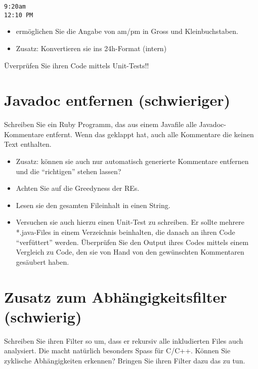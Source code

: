 \documentclass[a4paper,11pt,oneside]{scrbook}
\begin{document}
\begin{lstlisting}
9:20am
12:10 PM
\end{lstlisting}

\begin{itemize}
	\item ermöglichen Sie die Angabe von am/pm in Gross und Kleinbuchstaben.
	\item Zusatz: Konvertieren sie ins 24h-Format (intern)
\end{itemize}

Üverprüfen Sie ihren Code mittels Unit-Tests!!

\section{Javadoc entfernen (schwieriger)} %
\label{sec:javadoc_entfernen}
Schreiben Sie ein Ruby Programm, das aus einem Javafile alle Javadoc-Kommentare entfernt. Wenn das geklappt hat, auch alle Kommentare die keinen Text enthalten.
\begin{itemize}
	\item Zusatz: können sie auch nur automatisch generierte Kommentare entfernen und die “richtigen” stehen lassen?
	\item Achten Sie auf die Greedyness der REs.
	\item Lesen sie den gesamten Fileinhalt in einen String.
	\item Versuchen sie auch hierzu einen Unit-Test zu schreiben. Er sollte mehrere *.java-Files in einem Verzeichnis beinhalten, die danach an ihren Code “verfüttert” werden. Überprüfen Sie den Output ihres Codes mittels einem Vergleich zu Code, den sie von Hand von den gewünschten Kommentaren gesäubert haben.
\end{itemize}

\section{Zusatz zum Abhängigkeitsfilter (schwierig)} %
\label{sec:Zusatz zum Abhängigkeitsfilter}
Schreiben Sie ihren Filter so um, dass er rekursiv alle inkludierten Files auch analysiert. Die macht natürlich besonders Spass für C/C++.
Können Sie zyklische Abhängigkeiten erkennen? Bringen Sie ihren Filter dazu das zu tun.


\end{document}
